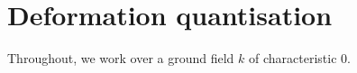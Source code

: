 \section{Deformation quantisation}
    \begin{convention}
        Throughout, we work over a ground field $k$ of characteristic $0$.
    \end{convention}
    
